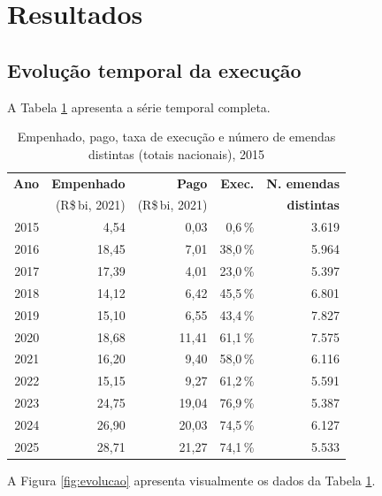 \documentclass[12pt,a4paper,oneside]{article}
\newcommand{\rs}{R\$\,}
\begin{document}
\section{Resultados}\label{sec:resultados}

\subsection{Evolução temporal da execução}

A Tabela \ref{tab:evolucao} apresenta a série temporal completa.

\begin{table}[H]
\centering
\caption{Empenhado, pago, taxa de execução e número de emendas distintas (totais nacionais), 2015}
\begin{tabular}{rrrrr}
\toprule
\textbf{Ano} & \textbf{Empenhado} & \textbf{Pago} & \textbf{Exec.} & \textbf{N. emendas} \\
             & (\rs bi, 2021)    & (\rs bi, 2021) &              & \textbf{distintas} \\
\midrule
2015 &  4,54 &  0,03 &  0,6\,\% &  3.619 \\
2016 & 18,45 &  7,01 & 38,0\,\% &  5.964 \\
2017 & 17,39 &  4,01 & 23,0\,\% &  5.397 \\
2018 & 14,12 &  6,42 & 45,5\,\% &  6.801 \\
2019 & 15,10 &  6,55 & 43,4\,\% &  7.827 \\
2020 & 18,68 & 11,41 & 61,1\,\% &  7.575 \\
2021 & 16,20 &  9,40 & 58,0\,\% &  6.116 \\
2022 & 15,15 &  9,27 & 61,2\,\% &  5.591 \\
2023 & 24,75 & 19,04 & 76,9\,\% &  5.387 \\
2024 & 26,90 & 20,03 & 74,5\,\% &  6.127 \\
2025 & 28,71 & 21,27 & 74,1\,\% &  5.533 \\
\bottomrule
\end{tabular}
\par{}
\label{tab:evolucao}
\end{table}

A Figura \ref{fig:evolucao} apresenta visualmente os dados da
Tabela \ref{tab:evolucao}.
\end{document}
